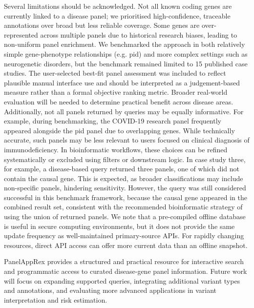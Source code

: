 Several limitations should be acknowledged. 
Not all known coding genes are currently linked to a disease panel; we prioritised high-confidence, traceable annotations over broad but less reliable coverage. 
Some genes are over-represented across multiple panels due to historical research biases, leading to non-uniform panel enrichment. 
We benchmarked the approach in both relatively simple gene-phenotype relationships (e.g. \ac{pid}) and more complex settings such as neurogenetic disorders, but the benchmark remained limited to 15 published case studies. 
The user-selected best-fit panel assessment was included to reflect plausible manual interface use and should be interpreted as a judgement-based measure rather than a formal objective ranking metric.
Broader real-world evaluation will be needed to determine practical benefit across disease areas.
Additionally, not all panels returned by queries may be equally informative. 
For example, during benchmarking, the COVID-19 research panel frequently appeared alongside the \ac{pid} panel due to overlapping genes. 
While technically accurate, such panels may be less relevant to users focused on clinical  diagnosis of immunodeficiency.
In bioinformatic workflows, these choices can be refined systematically or excluded using filters or downstream logic.
In case study three, for example, a disease-based query returned three panels, one of which did not contain the causal gene. This is expected, as broader classifications may include non-specific panels, hindering sensitivity. 
However, the query was still considered successful in this benchmark framework, because the causal gene appeared in the combined result set, consistent with the recommended bioinformatic strategy of using the union of returned panels.
We note that a pre-compiled offline database is useful in secure computing environments, but it does not provide the same update frequency as well-maintained primary-source APIs. For rapidly changing resources, direct API access can offer more current data than an offline snapshot.

PanelAppRex provides a structured and practical resource for interactive search and programmatic access to curated disease-gene panel information. 
Future work will focus on expanding supported queries, integrating additional variant types and annotations, and evaluating more advanced applications in variant interpretation and risk estimation.

